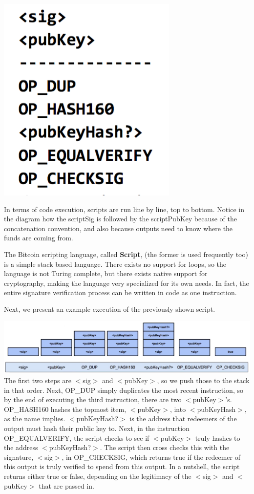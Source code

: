 \documentclass[full.tex]{subfiles}
\begin{document}
  \includegraphics[scale=1]{output_script}
  
  In terms of code execution, scripts are run line by line, top to bottom. Notice in the diagram how the scriptSig is followed by the scriptPubKey because of the concatenation convention, and also because outputs need to know where the funds are coming from. 
  
  The Bitcoin scripting language, called \textbf{Script}, (the former is used frequently too) is a simple stack based language. There exists no support for loops, so the language is not Turing complete, but there exists native support for cryptography, making the language very specialized for its own needs. In fact, the entire signature verification process can be written in code as one instruction.
  
  Next, we present an example execution of the previously shown script. 

\includegraphics[scale=0.2]{script_execution} \\

 The first two steps are $<$sig$>$ and $<$pubKey$>$, so we push those to the stack in that order. Next, OP\_DUP simply duplicates the most recent instruction, so by the end of executing the third instruction, there are two $<$pubKey$>$'s. OP\_HASH160 hashes the topmost item, $<$pubKey$>$, into $<$pubKeyHash$>$, as the name implies. $<$pubKeyHash?$>$ is the address that redeemers of the output must hash their public key to. Next, in the instruction OP\_EQUALVERIFY, the script checks to see if $<$pubKey$>$ truly hashes to the address $<$pubKeyHash?$>$. The script then cross checks this with the signature, $<$sig$>$, in OP\_CHECKSIG, which returns true if the redeemer of this output is truly verified to spend from this output. In a nutshell, the script returns either true or false, depending on the legitimacy of the $<$sig$>$ and $<$pubKey$>$ that are passed in. 
 
\end{document}
